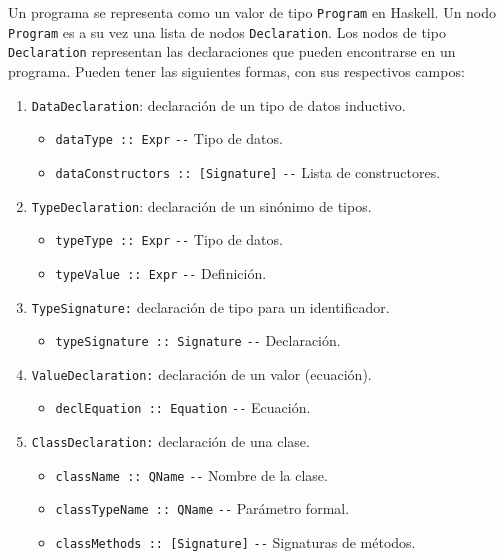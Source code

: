 Un programa \nuflo se representa como un valor de tipo \verb|Program| en Haskell.
Un nodo \verb|Program| es a su vez una lista de nodos \verb|Declaration|.
Los nodos de tipo \verb|Declaration| representan las declaraciones que pueden
encontrarse en un programa.
Pueden tener las siguientes formas, con sus respectivos campos:
\begin{enumerate}
  \item \verb|DataDeclaration|: declaración de un tipo de datos inductivo.
    \begin{itemize}
    \item
      \verb|dataType :: Expr| \hfill \verb|--| Tipo de datos.
    \item
      \verb|dataConstructors :: [Signature]| \hfill \verb|--| Lista de constructores.
    \end{itemize}
  \item \verb|TypeDeclaration|: declaración de un sinónimo de tipos.
    \begin{itemize}
    \item
      \verb|typeType :: Expr| \hfill \verb|--| Tipo de datos.
    \item
      \verb|typeValue :: Expr| \hfill \verb|--| Definición.
    \end{itemize}
  \item \verb|TypeSignature:| declaración de tipo para un identificador.
    \begin{itemize}
    \item \verb|typeSignature :: Signature| \hfill \verb|--| Declaración.
    \end{itemize}

  \item \verb|ValueDeclaration:| declaración de un valor (ecuación).
    \begin{itemize}
    \item \verb|declEquation :: Equation| \hfill \verb|--| Ecuación.
    \end{itemize}

  \item \verb|ClassDeclaration:| declaración de una clase.
    \begin{itemize}
    \item \verb|className :: QName| \hfill \verb|--| Nombre de la clase.
    \item \verb|classTypeName :: QName| \hfill \verb|--| Parámetro formal.
    \item \verb|classMethods :: [Signature]| \hfill \verb|--| Signaturas de métodos.
    \end{itemize}


\end{enumerate}

